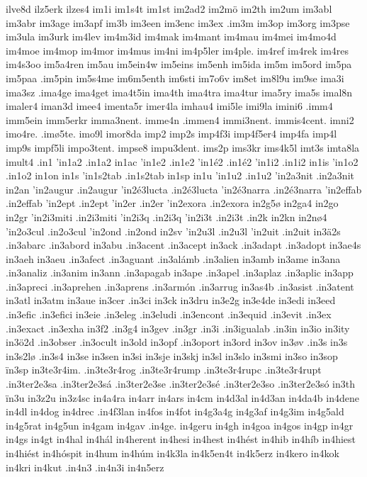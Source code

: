 {{ilve8d
ilz5erk
ilzes4
im1i
im1s4t
im1st
im2ad2
im2mö
im2th
im2um
im3abl
im3abr
im3age
im3apf
im3b
im3een
im3enc
im3ex
.im3m
im3op
im3org
im3pse
im3ula
im3urk
im4lev
im4m3id
im4mak
im4mant
im4mau
im4mei
im4mo4d
im4moe
im4mop
im4mor
im4mus
im4ni
im4p5ler
im4ple.
im4ref
im4rek
im4res
im4s3oo
im5a4ren
im5au
im5ein4w
im5eins
im5enh
im5ida
im5m
im5ord
im5pa
im5paa
.im5pin
im5s4me
im6m5enth
im6sti
im7o6v
im8et
im8l9u
im9se
ima3i
ima3sz
.ima4ge
ima4get
ima4t5in
ima4th
ima4tra
ima4tur
ima5ry
ima5s
imal8n
imaler4
iman3d
imee4
imenta5r
imer4la
imhau4
imi5le
imi9la
imini6
.imm4
imm5ein
imm5erkr
imma3nent.
imme4n
.immen4
immi3nent.
immis4cent.
imni2
imo4re.
.imø5te.
imo9l
imor8da
imp2
imp2s
imp4f3i
imp4f5er4
imp4fa
imp4l
imp9s
impf5li
impo3tent.
impse8
impu3dent.
ims2p
ims3kr
ims4k5l
imt3s
imta8la
imult4
.in1
'in1a2
.in1a2
in1ac
'in1e2
.in1e2
'in1é2
.in1é2
'in1i2
.in1i2
in1is
'in1o2
.in1o2
in1on
in1s
'in1s2tab
.in1s2tab
in1sp
in1u
'in1u2
.in1u2
'in2a3nit
.in2a3nit
in2an
'in2augur
.in2augur
'in2é3lucta
.in2é3lucta
'in2é3narra
.in2é3narra
'in2effab
.in2effab
'in2ept
.in2ept
'in2er
.in2er
'in2exora
.in2exora
in2g5ø
in2ga4
in2go
in2gr
'in2i3miti
.in2i3miti
'in2i3q
.in2i3q
'in2i3t
.in2i3t
.in2k
in2kn
in2nø4
'in2o3cul
.in2o3cul
'in2ond
.in2ond
in2sv
'in2u3l
.in2u3l
'in2uit
.in2uit
in3ä2s
.in3abarc
.in3abord
in3abu
.in3acent
.in3acept
in3ack
.in3adapt
.in3adopt
in3ae4s
in3aeh
in3aeu
.in3afect
.in3aguant
.in3alámb
.in3alien
in3amb
in3ame
in3ana
.in3analiz
.in3anim
in3ann
.in3apagab
in3ape
.in3apel
.in3aplaz
.in3aplic
in3app
.in3apreci
.in3aprehen
.in3aprens
.in3armón
.in3arrug
in3as4b
.in3asist
.in3atent
in3atl
in3atm
in3aue
in3cer
.in3ci
in3ck
in3dru
in3e2g
in3e4de
in3edi
in3eed
.in3efic
.in3efici
in3eie
.in3eleg
.in3eludi
.in3encont
.in3equid
.in3evit
.in3ex
.in3exact
.in3exha
in3f2
.in3g4
in3gev
.in3gr
.in3i
.in3igualab
.in3in
in3io
in3ity
in3ö2d
.in3obser
.in3ocult
in3old
in3opf
.in3oport
in3ord
in3ov
in3øv
.in3s
in3s
in3s2lø
.in3s4
in3se
in3sen
in3si
in3sje
in3skj
in3sl
in3slo
in3smi
in3so
in3sop
ïn3sp
in3te3r4im.
.in3te3r4rog
.in3te3r4rump
.in3te3r4rupc
.in3te3r4rupt
.in3ter2e3sa
.in3ter2e3sá
.in3ter2e3se
.in3ter2e3sé
.in3ter2e3so
.in3ter2e3só
in3th
ïn3u
in3z2u
in3z4sc
in4a4ra
in4arr
in4ars
in4cm
in4d3al
in4d3an
in4da4b
in4dene
in4dl
in4dog
in4drec
.in4f3lan
in4fos
in4fot
in4g3a4g
in4g3af
in4g3im
in4g5ald
in4g5rat
in4g5un
in4gam
in4gav
.in4ge.
in4geru
in4gh
in4goa
in4gos
in4gp
in4gr
in4gs
in4gt
in4hal
in4hál
in4herent
in4hesi
in4hest
in4hést
in4hib
in4híb
in4hiest
in4hiést
in4hóspit
in4hum
in4húm
in4k3la
in4k5en4t
in4k5erz
in4kero
in4kok
in4kri
in4kut
.in4n3
.in4n3i
in4n5erz
}}
